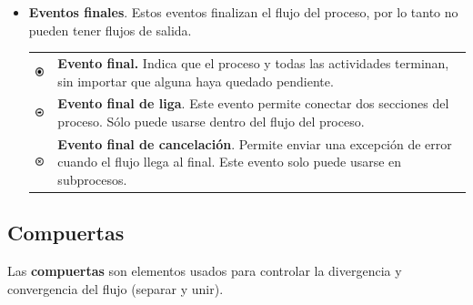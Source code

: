 \begin{itemize}
	\item {\bf Eventos finales}. Estos eventos finalizan el flujo del proceso, por lo tanto no pueden tener flujos de salida.

	\begin{tabular}{| m{} m{} | }%
		\rowcolor[gray]{0.97}%
		\centering\noindent\includegraphics[width=18pt]{images/procesos/bpmn/EndEvent.png} & {\bf Evento final.} Indica que el proceso y todas las actividades terminan, sin importar que alguna haya quedado pendiente. \\
		\centering\noindent\includegraphics[width=18pt]{images/procesos/bpmn/LinkEvent.png} & {\bf Evento final de liga}. Este evento permite conectar dos secciones del proceso. Sólo puede usarse dentro del flujo del proceso.\\
		\centering\noindent\includegraphics[width=18pt]{images/procesos/bpmn/CancelEndEvent.png} & {\bf Evento final de cancelación}. Permite enviar una excepción de error cuando el flujo llega al final. Este evento solo puede usarse en subprocesos.
	\end{tabular}%
\end{itemize}

\subsection{Compuertas}

Las {\bf compuertas} son elementos usados para controlar la divergencia y convergencia del flujo (separar y unir).\\

